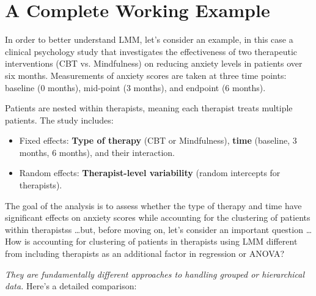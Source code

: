 \section{A Complete Working Example}
In order to better understand LMM, let's consider an example, in this case a clinical psychology study that investigates the effectiveness of two therapeutic interventions (CBT vs. Mindfulness) on reducing anxiety levels in patients over six months. Measurements of anxiety scores are taken at three time points: baseline (0 months), mid-point (3 months), and endpoint (6 months).

Patients are nested within therapists, meaning each therapist treats multiple patients. The study includes:
\begin{itemize}
\item Fixed effects: \textbf{Type of therapy} (CBT or Mindfulness), \textbf{time} (baseline, 3 months, 6 months), and their interaction.

\item Random effects: \textbf{Therapist-level variability} (random intercepts for therapists).
\end{itemize}

The goal of the analysis is to assess whether the type of therapy and time have significant effects on anxiety scores while accounting for the clustering of patients within therapistss \dots but, before moving on, let's consider an important question \dots How is accounting for clustering of patients in therapists using LMM different from including therapists as an additional factor in regression or ANOVA? 
\vspace{.2cm}

\noindent \textit{They are fundamentally different approaches to handling grouped or hierarchical data.} Here’s a detailed comparison:

